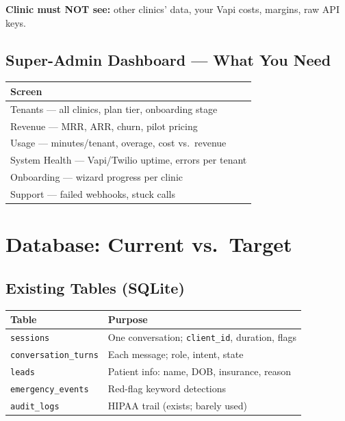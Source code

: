\documentclass[11pt,a4paper]{article}
\begin{document}
\textbf{Clinic must NOT see:} other clinics' data, your Vapi costs, margins, raw API keys.

\subsection{Super-Admin Dashboard --- What You Need}

\begin{center}
\small
\begin{tabular}{@{}l@{}}
\toprule
\textbf{Screen} \\
\midrule
Tenants --- all clinics, plan tier, onboarding stage \\
Revenue --- MRR, ARR, churn, pilot pricing \\
Usage --- minutes/tenant, overage, cost vs.\ revenue \\
System Health --- Vapi/Twilio uptime, errors per tenant \\
Onboarding --- wizard progress per clinic \\
Support --- failed webhooks, stuck calls \\
\bottomrule
\end{tabular}
\end{center}

\section{Database: Current vs.\ Target}

\subsection{Existing Tables (SQLite)}
\begin{center}
\small
\begin{tabular}{@{}ll@{}}
\toprule
\textbf{Table} & \textbf{Purpose} \\
\midrule
\texttt{sessions} & One conversation; \texttt{client\_id}, duration, flags \\
\texttt{conversation\_turns} & Each message; role, intent, state \\
\texttt{leads} & Patient info: name, DOB, insurance, reason \\
\texttt{emergency\_events} & Red-flag keyword detections \\
\texttt{audit\_logs} & HIPAA trail (exists; barely used) \\
\bottomrule
\end{tabular}
\end{center}
\end{document}
